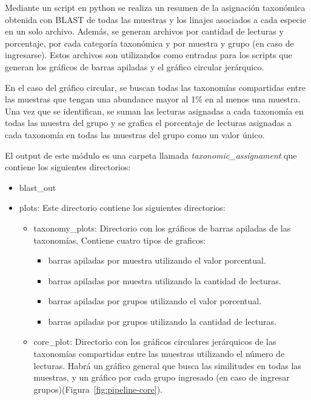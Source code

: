 Mediante un script en python se realiza un resumen de la asignación taxonómica obtenida con BLAST de todas las muestras y los linajes asociados a cada especie en un solo archivo. Además, se generan archivos por cantidad de lecturas y porcentaje, por cada categoría taxonómica y por muestra y grupo (en caso de ingresarse).
Estos archivos son utilizandos como entradas para los scripts que generan los gráficos de barras apiladas y  el gráfico circular jerárquico.


En el caso del gráfico circular, se buscan todas las taxonomías compartidas entre las muestras que tengan una abundance mayor al 1\% en al menos una muestra. 
Una vez que se identifican, se suman las lecturas asignadas a cada taxonomía en todas las muestra del grupo y se grafica el porcentaje de lecturas asignadas a cada taxonomía en todas las muestras del grupo como un valor único.

El output de este módulo es una carpeta llamada \textit{taxonomic\_assignament} que contiene los siguientes directorios:
\begin{itemize}
\item blast\_out
\item plots: Este directorio contiene los siguientes directorios:
\begin{itemize}
    \item taxonomy\_plots: Directorio con los gráficos de barras apiladas de las taxonomías. Contiene cuatro tipos de graficos: 
    \begin{itemize}
        \item barras apiladas por muestra utilizando el valor porcentual.
        \item barras apiladas por muestra utilizando la cantidad de lecturas.
        \item barras apiladas por grupos utilizando el valor porcentual.
        \item barras apiladas por grupos utilizando la cantidad de lecturas.
    \end{itemize}
    \item core\_plot: Directorio con los gráficos circulares jerárquicos de las taxonomías compartidas entre las muestras utilizando el número de lecturas. Habrá un gráfico general que busca las similitudes en todas las muestras, y un gráfico por cada grupo ingresado (en caso de ingresar grupos)(Figura~\ref{fig:pipeline-core}).
\end{itemize}
 \end{itemize}


